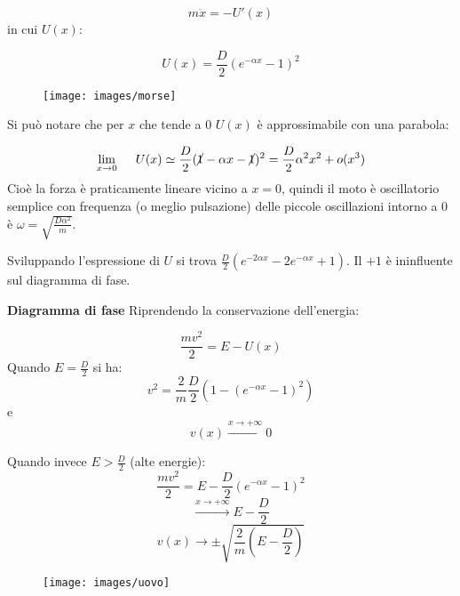 \documentclass[Main.tex]{subfiles}
\begin{document}
\begin{appendic}

\begin{equation}
  m \ddot x = - U'(x)
\end{equation}
in cui $U(x)$:

\begin{equation}
  U(x)= \frac{D}{2} (e^ {- \alpha x} -1)^2
\end{equation}

\begin{figure}[H]
    \centering
  \texttt{[image: images/morse]}
\end{figure}

Si può notare che per $x$ che tende a 0 $U(x)$ è approssimabile con una parabola:

\begin{equation}
  \lim_{x\rightarrow 0} \ \ \ \ U(x) \simeq \frac{D}{2} (\cancel{1} - \alpha x - \cancel{1})^2 = \frac{D}{2} \alpha^2 x^2 + o(x^3)
\end{equation}
Cioè la forza è praticamente lineare vicino a $x=0$, quindi il moto è oscillatorio semplice con frequenza (o meglio pulsazione) delle piccole oscillazioni intorno a 0 è $\omega = \sqrt{\frac{D \alpha^2}{m}}$.
\bigskip
\begin{osservazione} 
	Sviluppando l'espressione di $U$ si trova $\frac{D}{2} (e^{-2 \alpha x} - 2 e^{- \alpha x} +1)$. Il $+1$ è ininfluente sul diagramma di fase.
\end{osservazione}

\newpage \noindent 
\textbf{Diagramma di fase}
\newline
Riprendendo la conservazione dell'energia:

\begin{equation}
  \frac{mv^2}{2} = E-U(x)
\end{equation}
Quando $E= \frac{D}{2}$ si ha:
\begin{equation}
  v^2 = \frac{2}{m} \frac{D}{2}(1- (e^{- \alpha x}-1)^2)
\end{equation}
e 
\begin{equation}
  v(x)\xrightarrow{x\rightarrow + \infty}0
\end{equation}

Quando invece $E > \frac{D}{2}$ (alte energie):
\begin{equation}
  \frac{mv^2}{2} = E - \frac{D}{2} (e^{-\alpha x}-1)^2
\end{equation}
\begin{equation}
  \xrightarrow{x\rightarrow + \infty} E- \frac{D}{2}
\end{equation}
\begin{equation}
  v(x) \rightarrow \pm \sqrt{\frac{2}{m}(E - \frac{D}{2})}
\end{equation}


\begin{figure}[H]
    \centering
  \texttt{[image: images/uovo]}
\end{figure}
\end{appendic}
\end{document}
